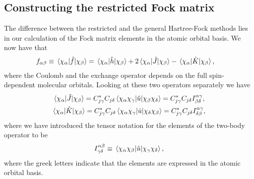         \subsection{Constructing the restricted Fock matrix}
            The difference between the restricted and the general Hartree-Fock
            methods lies in our calculation of the Fock matrix elements in the
            atomic orbital basis.
            We now have that
            \begin{align}
                f_{\alpha\beta}
                &\equiv \mel*{\chi_{\alpha}}{\hat{f}}{\chi_{\beta}}
                =
                \mel*{\chi_{\alpha}}{\hat{h}}{\chi_{\beta}}
                +
                2
                \mel*{\chi_{\alpha}}{\hat{J}}{\chi_{\beta}}
                -
                \mel*{\chi_{\alpha}}{\hat{K}}{\chi_{\beta}},
            \end{align}
            where the Coulomb and the exchange operator depends on the full
            spin-dependent molecular orbitals.
            Looking at these two operators separately we have
            \begin{gather}
                \mel*{\chi_{\alpha}}{\hat{J}}{\chi_{\beta}}
                =
                C^{*}_{j\gamma} C_{j\delta}
                \mel*{\chi_{\alpha}\chi_{\gamma}}{
                    \hat{u}
                }{\chi_{\beta}\chi_{\delta}}
                =
                C^{*}_{j\gamma} C_{j\delta}
                I^{\alpha\gamma}_{\beta\delta},
                \\
                \mel*{\chi_{\alpha}}{\hat{K}}{\chi_{\beta}}
                =
                C^{*}_{j\gamma} C_{j\delta}
                \mel*{\chi_{\alpha}\chi_{\gamma}}{
                    \hat{u}
                }{\chi_{\delta}\chi_{\beta}}
                =
                C^{*}_{j\gamma} C_{j\delta}
                I^{\alpha\gamma}_{\delta\beta},
            \end{gather}
            where we have introduced the tensor notation for the elements of the
            two-body operator to be
            \begin{align}
                I^{\alpha\beta}_{\gamma\delta}
                \equiv
                \mel*{\chi_{\alpha}\chi_{\beta}}{
                    \hat{u}
                }{\chi_{\gamma}\chi_{\delta}},
            \end{align}
            where the greek letters indicate that the elements are expressed in
            the atomic orbital basis.
